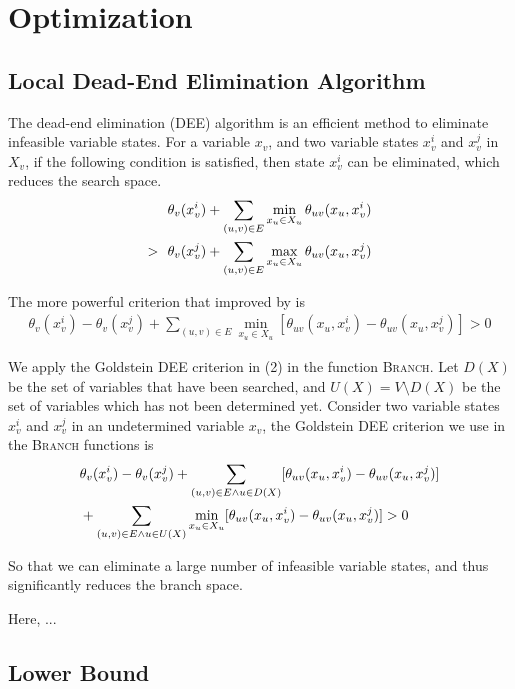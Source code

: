 \section{Optimization}

\subsection{Local Dead-End Elimination Algorithm}
The dead-end elimination (DEE) algorithm is an efficient method to eliminate infeasible variable state{\color{red}s}. For a variable $x_v$, and two variable states $x_v^i$ and $x_v^j$ in $X_v$, if the following condition is satisfied, then state $x_v^i$ can be eliminated, which reduces the search space.
\begin{align}
& \theta_v(x_v^i)+\sum_{(u,v)\in E}\min_{x_u\in X_u}\theta_{uv}(x_u,x_v^i) \notag \\
>\ \ & \theta_v(x_v^j)+\sum_{(u,v)\in E}\max_{x_u\in X_u}\theta_{uv}(x_u,x_v^j)
\end{align}

The more powerful criterion that improved by \cite{goldstein1994efficient} is
\begin{align}
\theta_v(x_v^i)-\theta_v(x_v^j)+\sum_{(u,v)\in E}\min_{x_u\in X_u}[\theta_{uv}(x_u,x_v^i)-\theta_{uv}(x_u,x_v^j)] > 0
\end{align}

We apply the Goldstein DEE criterion in (2) in the function \textsc{Branch}. Let $D(X)$ be the set of variables that have been searched, and $U(X)=V\setminus D(X)$ be the set of variables which has not been determined yet. Consider two variable states $x_v^i$ and $x_v^j$ in an undetermined variable $x_v$, the Goldstein DEE criterion we use in the \textsc{Branch} functions is
\begin{align}
& \theta_v(x_v^i)-\theta_v(x_v^j)+\sum_{(u,v)\in E\wedge u\in D(X)}[\theta_{uv}(x_u,x_v^i)-\theta_{uv}(x_u,x_v^j)] \notag \\
& +\sum_{(u,v)\in E\wedge u\in U(X)}\min_{x_u\in X_u}[\theta_{uv}(x_u,x_v^i)-\theta_{uv}(x_u,x_v^j)] > 0
\end{align}

So that we can eliminate a large number of infeasible variable states, and thus significantly reduces the branch space.

Here, ...

\subsection{Lower Bound}

